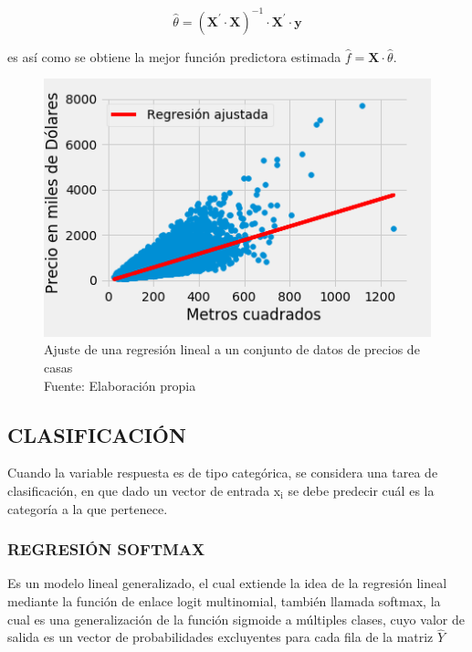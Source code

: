         \begin{equation}
            \hat{\theta} = (\mathbf{X}^\prime\cdot\mathbf{X})^{-1}\cdot\mathbf{X}^\prime\cdot\mathbf{y}
        \end{equation}
        
        \noindent es así como se obtiene la mejor función predictora estimada $\hat{f} = \mathbf{X}\cdot\hat{\theta}$.
        
        \begin{figure}[H]
            \centering
            \includegraphics[scale=0.5]{imagenes/linear_fit}
            \caption{Ajuste de una regresión lineal a un conjunto de datos de precios de casas\\ Fuente: Elaboración propia}
        \end{figure}
    \subsection{CLASIFICACIÓN}
        Cuando la variable respuesta es de tipo categórica, se considera una tarea de clasificación, en que dado un vector de entrada $\mathrm{x_i}$ se debe predecir cuál es la categoría a la que pertenece. \citep{hastie01statisticallearning}
        \subsubsection{REGRESIÓN SOFTMAX}
        Es un modelo lineal generalizado, el cual extiende la idea de la regresión lineal mediante la función de enlace logit multinomial, también llamada softmax, la cual es una generalización de la función sigmoide a múltiples clases, cuyo valor de salida es un vector de probabilidades excluyentes para cada fila de la matriz $\hat{Y}$
        
